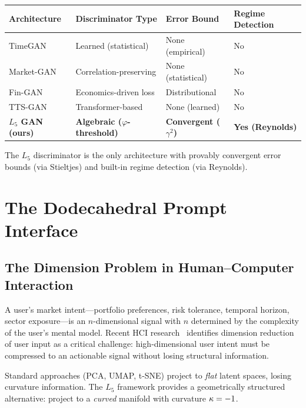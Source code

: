 \begin{center}
\begin{tabular}{@{}llll@{}}
\toprule
\textbf{Architecture} & \textbf{Discriminator Type} & \textbf{Error Bound} & \textbf{Regime Detection} \\
\midrule
TimeGAN~\cite{timegan2019} & Learned (statistical) & None (empirical) & No \\
Market-GAN~\cite{eckerli2021} & Correlation-preserving & None (statistical) & No \\
Fin-GAN~\cite{fingan2024} & Economics-driven loss & Distributional & No \\
TTS-GAN~\cite{ttsgan2024} & Transformer-based & None (learned) & No \\
\textbf{$L_5$ GAN (ours)} & \textbf{Algebraic ($\varphi$-threshold)} & \textbf{Convergent ($\gamma^2$)} & \textbf{Yes (Reynolds)} \\
\bottomrule
\end{tabular}
\end{center}

The $L_5$ discriminator is the only architecture with provably convergent error bounds (via Stieltjes) and built-in regime detection (via Reynolds).

\section{The Dodecahedral Prompt Interface}

\subsection{The Dimension Problem in Human--Computer Interaction}

A user's market intent---portfolio preferences, risk tolerance, temporal horizon, sector exposure---is an $n$-dimensional signal with $n$ determined by the complexity of the user's mental model. Recent HCI research~\cite{hci_prompt2025} identifies dimension reduction of user input as a critical challenge: high-dimensional user intent must be compressed to an actionable signal without losing structural information.

Standard approaches (PCA, UMAP, t-SNE) project to \emph{flat} latent spaces, losing curvature information. The $L_5$ framework provides a geometrically structured alternative: project to a \emph{curved} manifold with curvature $\kappa = -1$.

